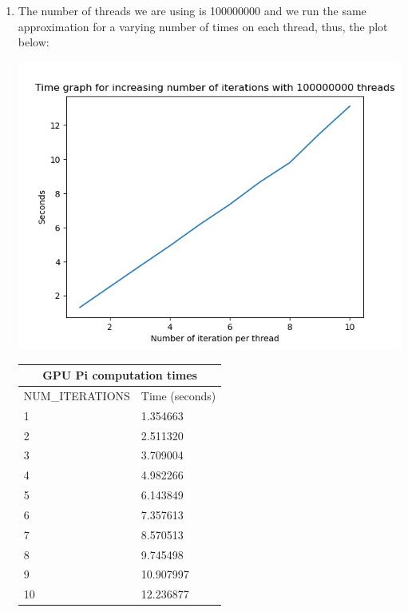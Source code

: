 \documentclass[english]{exam}
\begin{document}
\begin{enumerate}
\item The number of threads we are using is 100000000 and we run the same approximation for a varying number of times on each thread, thus, the plot below:\\
  \begin{center}
    \includegraphics[scale=0.65]{plot1.png}
  \end{center}
  \begin{tabular}{ |p{6cm}||p{6cm}|  }
    \hline
    \multicolumn{2}{|c|}{GPU Pi computation times} \\
    \hline
    NUM\_ITERATIONS & Time (seconds)\\
    \hline
    1 & 1.354663\\
    2 & 2.511320\\
    3 & 3.709004\\
    4 & 4.982266\\
    5 & 6.143849\\
    6 & 7.357613\\
    7 & 8.570513\\
    8 & 9.745498\\
    9 & 10.907997\\
    10 & 12.236877\\
    \hline
  \end{tabular}


\end{enumerate}
\end{document}
